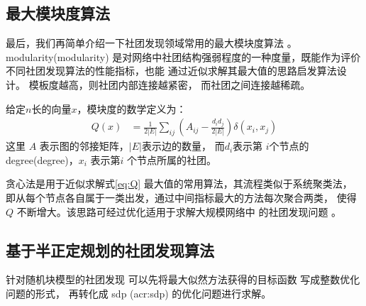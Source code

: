 

\subsection{最大模块度算法}

最后，我们再简单介绍一下社团发现领域常用的最大模块度算法
\cite{newman2006modularity}。
\gls{modularity}(\glsdesc{modularity})
是对网络中社团结构强弱程度的一种度量，既能作为评价
不同社团发现算法的性能指标，也能
通过近似求解其最大值的思路启发算法设计。
模板度越高，则社团内部连接越紧密，
而社团之间连接越稀疏。

给定$n$长的向量$x$，模块度的数学定义为：
\begin{align}\label{eq:Q}
  Q(x) &= \frac{1}{2 |E|} \sum_{ij} (A_{ij} - \frac{d_i d_j}{2 |E|}) \delta(x_i, x_j)
\end{align}
这里 $A$ 表示图的邻接矩阵，$|E|$表示边的数量，
而$d_i$表示第
$i$个节点的\gls{degree}(\glsdesc{degree})，$x_i$ 表示第$i$
个节点所属的社团。

贪心法是用于近似求解式\eqref{eq:Q}
最大值的常用算法，其流程类似于系统聚类法，
即从每个节点各自属于一类出发，通过中间指标最大的方法每次聚合两类，
使得 $Q$ 不断增大。该思路可经过优化适用于求解大规模网络中
的社团发现问题 \cite{clauset2004finding}。

\subsection{基于半正定规划的社团发现算法}

针对随机块模型的社团发现
可以先将最大似然方法获得的目标函数
写成整数优化问题的形式，
再转化成 \gls{sdp} (\gls{acr:sdp}) 的优化问题进行求解。


